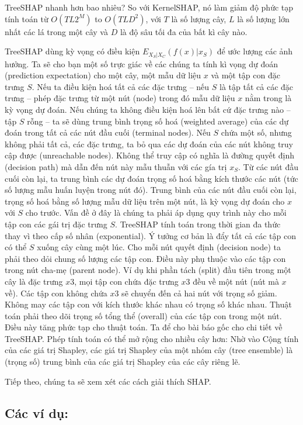 \begin{enumerate}
TreeSHAP nhanh hơn bao nhiêu? So với KernelSHAP, nó làm giảm độ phức tạp tính toán từ $O(TL2^M)$ to $O(TLD^2)$, với $T$ là số lượng cây, $L$ là số lượng lớn nhất các lá trong một cây và $D$ là độ sâu tối đa của bất kì cây nào. 

TreeSHAP dùng kỳ vọng có điều kiện $E_{X_S|X_C}(f(x)|x_S)$ để ước lượng các ảnh hưởng. Ta sẽ cho bạn một số trực giác về các chúng ta tính kì vọng dự đoán (prediction expectation) cho một cây, một mẫu dữ liệu $x$ và một tập con đặc trưng $S$. Nếu ta điều kiện hoá tất cả các đặc trưng – nếu $S$ là tập tất cả các đặc trưng – phép đặc trưng từ một nút (node) trong đó mẫu dữ liệu $x$ nằm trong là kỳ vọng dự đoán. Nếu chúng ta không điều kiện hoá lên bất cứ đặc trưng nào – tập $S$ rỗng – ta sẽ dùng trung bình trọng số hoá (weighted average) của các dự đoán trong tất cả các nút đầu cuối (terminal nodes). Nếu $S$ chứa một số, nhưng không phải tất cả, các đặc trưng, ta bỏ qua các dự đoán của các nút không truy cập được (unreachable nodes). Không thể truy cập có nghĩa là đường quyết định (decision path) mà dẫn đến nút này mẫu thuẫn với các gía trị $x_S$. Từ các nút đầu cuối còn lại, ta trung bình các dự đoán trọng số hoá bằng kích thước các nút (tức số lượng mẫu huấn luyện trong nút đó). Trung bình của các nút đầu cuối còn lại, trọng số hoá bằng số lượng mẫu dữ liệu trên một nút, là kỳ vọng dự đoán cho $x$ với $S$ cho trước. Vấn đề ở đây là chúng ta phải áp dụng quy trình này cho mỗi tập con các gái trị đặc trưng $S$. TreeSHAP tính toán trong thời gian đa thức thay vì theo cấp số nhân (exponential). Ý tưởng cơ bản là đẩy tất cả các tập con có thể $S$ xuống cây cùng một lúc. Cho mỗi nút quyết định (decision node) ta phải theo dỏi chung số lượng các tập con. Điều này phụ thuộc vào các tập con trong nút cha-mẹ (parent node). Ví dụ khi phần tách (split) đầu tiên trong một cây là đặc trưng $x3$, mọi tập con chứa đặc trưng $x3$ đều về một nút (nút mà $x$ về). Các tập con không chứa $x3$ sẽ chuyển đến cả hai nút với trọng số giảm. Không may các tập con với kích thước khác nhau có trọng số khác nhau. Thuật toán phải theo dõi trọng số tổng thể (overall) của các tập con trong một nút. Điều này tăng phức tạp cho thuật toán. Ta để cho bài báo gốc cho chi tiết về TreeSHAP. Phép tính toán có thể mở rộng cho nhiều cây hơn: Nhờ vào Cộng tính của các giá trị Shapley, các giá trị Shapley của một nhóm cây (tree ensemble) là (trọng số) trung bình của các giá trị Shapley của các cây riêng lẽ. 

Tiếp theo, chúng ta sẽ xem xét các cách giải thích SHAP. 
\subsection{Các ví dụ:}


\end{enumerate}
